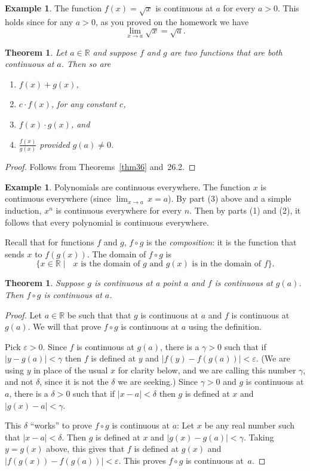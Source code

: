 \documentclass[12pt]{amsart}
\def\d{\delta}
\def\e{\varepsilon}
\newcommand{\R}{{\mathbb{R}}}
\numberwithin{equation}{section}
\theoremstyle{plain} %
\newtheorem{thm}[equation]{Theorem}
\theoremstyle{definition}
\newtheorem{ex}[equation]{Example}
\theoremstyle{remark}
\begin{document}
\begin{ex}  The function $f(x)=\sqrt{x}$ is  continuous at $a$ for every $a>0$. This holds since for any $a > 0$, as you proved on the homework we have
  $$
  \lim_{x \to a} \sqrt{x} = \sqrt{a}.
  $$
\end{ex}






\begin{thm} Let $a\in \R$ and suppose $f$ and $g$ are two functions that are both
  continuous at $a$. Then so are
\begin{enumerate}
\item $f(x) + g(x)$,
\item $c \cdot f(x)$, for any constant $c$,
\item $f(x) \cdot g(x)$, and
\item $\frac{f(x)}{g(x)}$ provided $g(a) \ne 0$.
\end{enumerate}
\end{thm}
\begin{proof}
Follows from Theorems~\ref{thm36} and~26.2.\end{proof}

\begin{ex} Polynomials are continuous everywhere. The function $x$ is continuous everywhere (since $\lim_{x\to a} \, x = a$). By part (3) above and a simple induction, $x^n$ is continuous everywhere for every $n$. Then by parts (1) and (2), it follows that every polynomial is continuous everywhere.
\end{ex}

Recall that for functions $f$ and $g$, $f \circ g$ is the {\em composition}: it is the function that
sends $x$ to $f(g(x))$. The domain of $f \circ g$ is
$$
\{x \in \R \mid \text{ $x$ is the domain of $g$ and $g(x)$ is in the domain of $f$} \}.
$$


\begin{thm} Suppose $g$ is continuous at a point $a$ and $f$ is continuous at $g(a)$. Then $f \circ
  g$ is continuous at $a$.
\end{thm}
\begin{proof}
  Let $a \in \R$ be such that that $g$ is continuous at $a$ and $f$ is continuous at $g(a)$.
  We will that prove $f \circ g$ is continuous at $a$ using the definition.
  
 Pick $\e > 0$. Since $f$ is continuous at $g(a)$, there is a $\gamma > 0$ such that if $|y
  - g(a)| < \gamma$ then $f$ is defined at $y$ and $|f(y) - f(g(a))| < \e$. (We are using $y$ in place of the usual $x$ for clarity below, and 
we are calling this number $\gamma$, and not $\d$, since it is
  not the $\d$ we are seeking.) Since $\gamma > 0$ and $g$ is continuous at $a$, there is a $\d > 0$ such
  that if $|x - a| < \d$ then $g$ is defined at $x$ and $|g(x) - a| < \gamma$. 

  This $\d$ ``works'' to prove $f \circ g$ is continuous at $a$: Let $x$ be any real number such that  $|x-a| < \d$. Then $g$ is defined at $x$ and {${|g(x) - g(a)| < \gamma}$}.
  Taking $y = g(x)$ above, this gives that $f$ is defined at $g(x)$ and $|f(g(x)) -
f(g(a))| < \e$. This proves $f \circ g$ is continuous at~$a$.
\end{proof}
\end{document}
